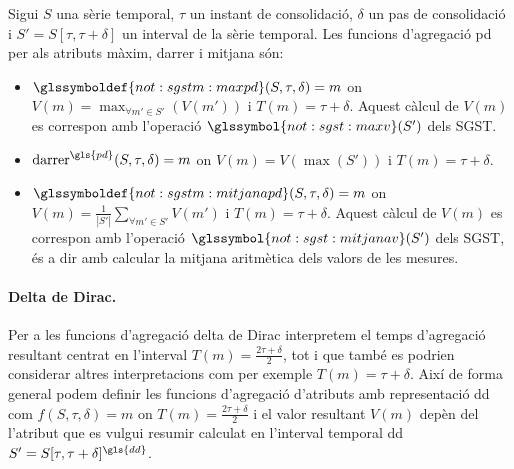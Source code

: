 \begin{definition}
  Sigui $S$ una sèrie temporal, $\tau$ un instant de consolidació,
  $\delta$ un pas de consolidació i $S'=S[\tau,\tau+\delta]$ un
  interval de la sèrie temporal. Les funcions d'agregació \gls{pd} per
  als atributs màxim, darrer i mitjana són:
  \begin{itemize}

  \item $\glssymboldef{not:sgstm:maxpd}(S,\tau,\delta)=m$ on $V(m) =
    \max_{\forall m' \in S'}(V(m'))$ i $T(m)=\tau+\delta$. Aquest càlcul
    de $V(m)$ es correspon amb l'operació
    $\glssymbol{not:sgst:maxv}(S')$ dels
    \gls{SGST}.  \label{def:sgstm:maxpd}

\item $\operatorname{darrer}^{\gls{pd}}(S,\tau,\delta)=m$ on $V(m) =
  V(\max(S'))$ i $T(m)=\tau+\delta$.

\item $\glssymboldef{not:sgstm:mitjanapd}(S,\tau,\delta)=m$ on $V(m) =
  \frac{1}{|S'|} \sum\limits_{\forall m'\in S'} V(m')$ i
  $T(m)=\tau+\delta$. Aquest càlcul de $V(m)$ es correspon amb
  l'operació $\glssymbol{not:sgst:mitjanav}(S')$ dels \gls{SGST}, és a
  dir amb calcular la mitjana aritmètica dels valors de les
  mesures. \label{def:sgstm:mitjanapd}
\end{itemize}

\end{definition}





\paragraph{Delta de Dirac.} 
Per a les funcions d'agregació delta de Dirac interpretem el temps
d'agregació resultant centrat en l'interval $T(m)=\frac{2\tau+\delta}{2}$,
tot i que també es podrien considerar altres interpretacions com per
exemple $T(m)=\tau+\delta$. Així de forma general podem definir les funcions
d'agregació d'atributs amb representació \gls{dd} com $f(S,\tau,\delta)=m$ on
$T(m)=\frac{2\tau+\delta}{2}$ i el valor resultant $V(m)$ depèn del l'atribut
que es vulgui resumir calculat en l'interval temporal \gls{dd}
$S'=S[\tau,\tau+\delta]^{\gls{dd}}$.


